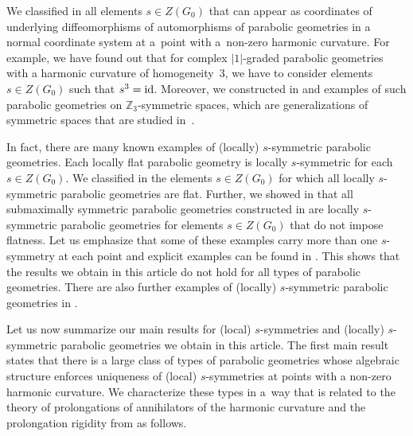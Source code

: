 \documentclass[10pt,a4paper]{amsart}
\newcommand{\id}{{\rm id}}
\numberwithin{equation}{section}
\begin{document}
We classif\/ied in \cite{GZ3} all elements $s\in Z(G_0)$ that can appear as coordinates of underlying dif\/feomorphisms of automorphisms of parabolic geometries in a normal coordinate system at a~point with a~non-zero harmonic curvature. For example, we have found out that for complex $|1|$-graded parabolic geometries with a harmonic curvature of homogeneity~$3$, we have to consider elements $s\in Z(G_0)$ such that $s^3=\id$. Moreover, we constructed in \cite[Proposition~6.1]{GZ2} and \cite[Proposition~7.2]{GZ3} examples of such parabolic geometries on $\mathbb{Z}_3$-symmetric spaces, which are generalizations of symmetric spaces that are studied in~\cite{Kowalski}.

In fact, there are many known examples of (locally) $s$-symmetric parabolic geometries. Each locally f\/lat parabolic geometry is locally $s$-symmetric for each $s\in Z(G_0)$. We classif\/ied in \cite{GZ3} the elements $s\in Z(G_0)$ for which all locally $s$-symmetric parabolic geometries are f\/lat. Further, we showed in \cite[Proposition 6.1]{GZ2} that all submaximally symmetric parabolic geometries constructed in \cite[Section 4.1]{KT} are locally $s$-symmetric parabolic geometries for elements $s\in Z(G_0)$ that do not impose f\/latness. Let us emphasize that some of these examples carry more than one $s$-symmetry at each point and explicit examples can be found in \cite[Section 6]{GZ2}.
This shows that the results we obtain in this article do not hold for all types of parabolic geometries.
There are also further examples of (locally) $s$-symmetric parabolic geometries in \cite{BFG,G2,G3,GZ4,Podesta}.

Let us now summarize our main results for (local) $s$-symmetries and (locally) $s$-symmetric parabolic geometries we obtain in this article. The f\/irst main result states that there is a large class of types of parabolic geometries whose algebraic structure enforces uniqueness of (local) $s$-symmetries at points with a non-zero harmonic curvature. We characterize these types in a~way that is related to the theory of prolongations of annihilators of the harmonic curvature and the prolongation rigidity from \cite[Section~3.4]{KT} as follows.
\end{document}
